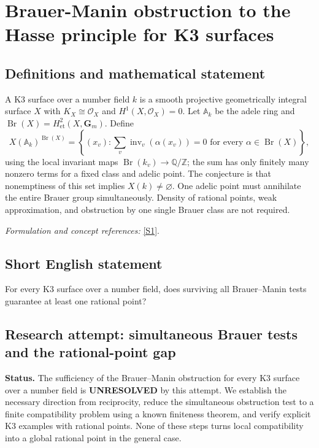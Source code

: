 \documentclass[11pt]{article}
\begin{document}
\section*{\texorpdfstring{Brauer-Manin obstruction to the Hasse principle for K3 surfaces}{Brauer-Manin obstruction to the Hasse principle for K3 surfaces}}\label{30006896}
\subsection{Definitions and mathematical statement}
A K3 surface over a number field $k$ is a smooth projective geometrically integral surface $X$ with $K_X\cong\mathcal O_X$ and $H^1(X,\mathcal O_X)=0$. Let ${\mathbb{A}}_k$ be the adele ring and $\operatorname{Br}(X)=H^2_{\mathrm{et}}(X,\mathbf G_m)$. Define
\[
 X({\mathbb{A}}_k)^{\operatorname{Br}(X)}=
 \left\{(x_v):\sum_v\operatorname{inv}_v(\alpha(x_v))=0
 \text{ for every }\alpha\in\operatorname{Br}(X)\right\},
\]
using the local invariant maps $\operatorname{Br}(k_v)\to{\mathbb{Q}}/{\mathbb{Z}}$; the sum has only finitely many nonzero terms for a fixed class and adelic point. The conjecture is that nonemptiness of this set implies $X(k)\ne\varnothing$. One adelic point must annihilate the entire Brauer group simultaneously. Density of rational points, weak approximation, and obstruction by one single Brauer class are not required.
\par\smallskip\textit{Formulation and concept references:} \href{https://arxiv.org/html/2502.08723v1}{[S1]}.

\subsection{Short English statement}
For every K3 surface over a number field, does surviving all Brauer--Manin tests guarantee at least one rational point?
\subsection{Research attempt: simultaneous Brauer tests and the rational-point gap}
\textbf{Status.} The sufficiency of the Brauer--Manin obstruction for every K3 surface over a number field is \textbf{UNRESOLVED} by this attempt. We establish the necessary direction from reciprocity, reduce the simultaneous obstruction test to a finite compatibility problem using a known finiteness theorem, and verify explicit K3 examples with rational points. None of these steps turns local compatibility into a global rational point in the general case.
\end{document}
